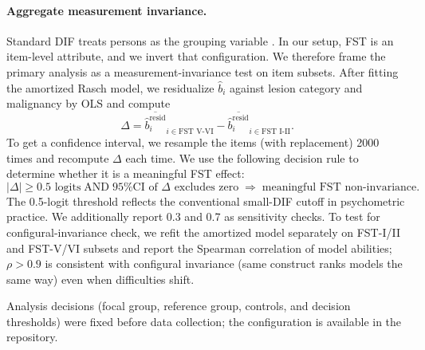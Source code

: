 \documentclass{article}
\begin{document}
\paragraph{Aggregate measurement invariance.}
\label{sec:aggregate}
Standard DIF treats persons as the grouping variable \citep[Ch.~6]{truong2026aims}. In our setup, FST is an item-level attribute, and we invert that configuration. We therefore frame the primary analysis as a measurement-invariance test on item subsets. After fitting the amortized Rasch model, we residualize $\hat b_i$ against lesion category and malignancy by OLS and compute
\begin{equation}
\Delta = \overline{\hat b_i^{\text{resid}}}_{i \in \text{FST V-VI}} - \overline{\hat b_i^{\text{resid}}}_{i \in \text{FST I-II}}.
\end{equation}
To get a confidence interval, we resample the items (with replacement) 2000 times and recompute $\Delta$ each time. We use the following decision rule to determine whether it is a meaningful FST effect:
\begin{equation}
|\Delta| \geq 0.5 \text{ logits} \;\text{AND}\; \text{95\% CI of } \Delta \text{ excludes zero} \;\Rightarrow\; \text{meaningful FST non-invariance}.
\end{equation}
The 0.5-logit threshold reflects the conventional small-DIF cutoff in psychometric practice. We additionally report 0.3 and 0.7 as sensitivity checks. To test for configural-invariance check, we refit the amortized model separately on FST-I/II and FST-V/VI subsets and report the Spearman correlation of model abilities; $\rho > 0.9$ is consistent with configural invariance (same construct ranks models the same way) even when difficulties shift.

Analysis decisions (focal group, reference group, controls, and decision thresholds) were fixed before data collection; the configuration is available in the repository.
\end{document}
